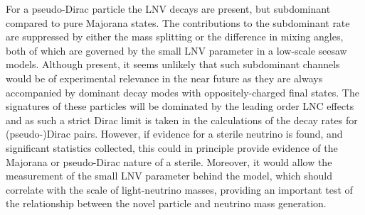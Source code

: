 %
%
%
For a pseudo-Dirac particle the LNV decays are present, but subdominant compared to pure Majorana states.
The contributions to the subdominant rate are suppressed by either the mass %
splitting or the difference in mixing angles, both of which are governed by the %
small LNV parameter in a low-scale seesaw models.
Although present, it seems unlikely that such subdominant channels would be of experimental relevance in %
the near future as they are always accompanied by dominant decay modes with oppositely-charged final states.
The signatures of these particles will be dominated by the leading order LNC effects and %
as such a strict Dirac limit is taken in the calculations of the decay rates for (pseudo-)Dirac pairs.
However, if evidence for a sterile neutrino is found, and significant statistics collected, this could in principle provide %
evidence of the Majorana or pseudo-Dirac nature of a sterile.
Moreover, it would allow the measurement of the small LNV parameter behind the model, %
which should correlate with the scale of light-neutrino masses, %
providing an important test of the relationship between the novel particle and neutrino mass generation.


